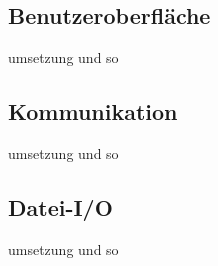 \subsection{Benutzeroberfläche}
umsetzung und so

\subsection{Kommunikation}
umsetzung und so

\subsection{Datei-I/O}
umsetzung und so
